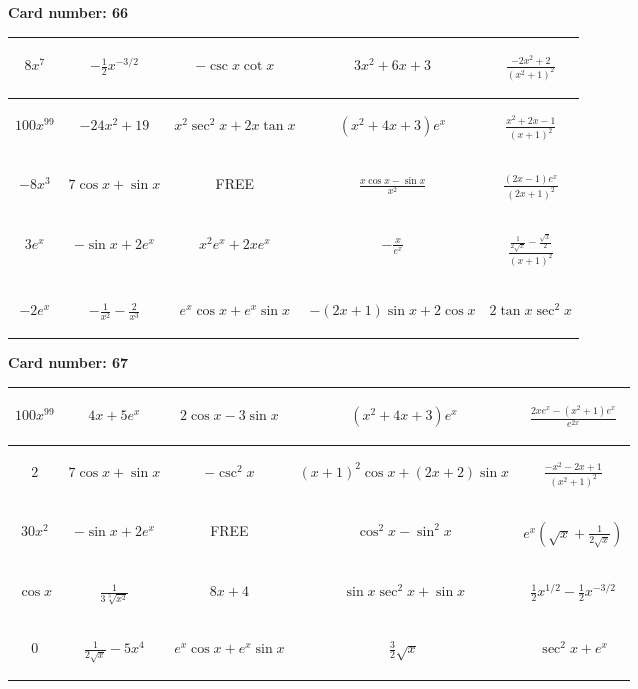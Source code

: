 \documentclass{article}
\newcommand{\entry}[1]{\begin{minipage}[t][2.75cm][t]{4cm} \vspace{1cm} \begin{center}#1\end{center} \end{minipage}}
\newcommand{\freespace}{\entry{FREE}}
\newcommand{\cardnumber}[1]{\noindent \textbf{Card number: #1} \bigskip}
\begin{document}
\pagebreak

\cardnumber{66}
\begin{center}
\begin{tabular}{|*{5}{c|}}
    \hline
    \entry{$8x^7$} & \entry{$-\frac{1}{2} x^{-3/2}$} & \entry{$-\csc x \cot x$} & \entry{$3x^2 + 6x + 3$} & \entry{$\frac{-2x^2 + 2}{(x^2 + 1)^2}$} \\ \hline
    \entry{$100x^{99}$} & \entry{$-24x^2 + 19$} & \entry{$x^2 \sec^2 x + 2x \tan x$} & \entry{$(x^2 + 4x + 3) e^x$} & \entry{$\frac{x^2 + 2x - 1}{(x + 1)^2}$} \\ \hline
    \entry{$-8x^3$} & \entry{$7 \cos x + \sin x$} & \freespace & \entry{$\frac{x \cos x - \sin x}{x^2}$} & \entry{$\frac{(2x - 1) e^x}{(2x + 1)^2}$} \\ \hline
    \entry{$3e^x$} & \entry{$-\sin x + 2e^x$} & \entry{$x^2 e^x + 2x e^x$} & \entry{$-\frac{x}{e^x}$} & \entry{$\frac{\frac{1}{2 \sqrt{x}} - \frac{\sqrt{x}}{2}}{(x + 1)^2}$} \\ \hline
    \entry{$-2e^x$} & \entry{$-\frac{1}{x^2} - \frac{2}{x^3}$} & \entry{$e^x \cos x + e^x \sin x$} & \entry{$-(2x + 1) \sin x + 2 \cos x$} & \entry{$2 \tan x \sec^2 x$} \\ \hline
\end{tabular}
\end{center}

\pagebreak

\cardnumber{67}
\begin{center}
\begin{tabular}{|*{5}{c|}}
    \hline
    \entry{$100x^{99}$} & \entry{$4x + 5e^x$} & \entry{$2 \cos x - 3 \sin x$} & \entry{$(x^2 + 4x + 3) e^x$} & \entry{$\frac{2x e^x - (x^2 + 1) e^x}{e^{2x}}$} \\ \hline
    \entry{$2$} & \entry{$7 \cos x + \sin x$} & \entry{$-\csc^2 x$} & \entry{$(x + 1)^2 \cos x + (2x + 2) \sin x$} & \entry{$\frac{-x^2 - 2x + 1}{(x^2 + 1)^2}$} \\ \hline
    \entry{$30x^2$} & \entry{$-\sin x + 2e^x$} & \freespace & \entry{$\cos^2 x - \sin^2 x$} & \entry{$e^x \left(\sqrt{x} + \frac{1}{2\sqrt{x}}\right)$} \\ \hline
    \entry{$\cos x$} & \entry{$\frac{1}{3\sqrt[3]{x^2}}$} & \entry{$8x + 4$} & \entry{$\sin x \sec^2 x + \sin x$} & \entry{$\frac{1}{2} x^{1/2} - \frac{1}{2} x^{-3/2}$} \\ \hline
    \entry{$0$} & \entry{$\frac{1}{2\sqrt{x}} - 5x^4$} & \entry{$e^x \cos x + e^x \sin x$} & \entry{$\frac{3}{2} \sqrt{x}$} & \entry{$\sec^2 x + e^x$} \\ \hline
\end{tabular}
\end{center}
\end{document}
